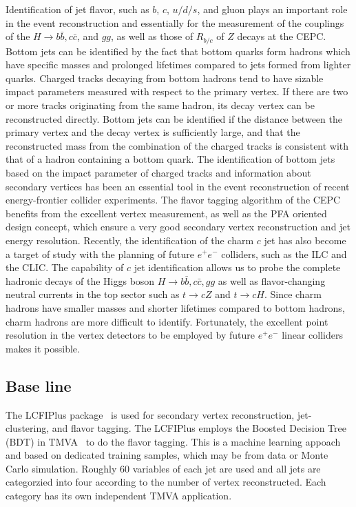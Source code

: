 Identification of jet flavor, such as $b$, $c$, $u/d/s$, and gluon plays an important role in the event reconstruction
and essentially for the measurement of the couplings of the $H \to b\bar{b}, c\bar{c}$, and $gg$,
as well as those of $R_{b/c}$ of $Z$ decays at the CEPC.
Bottom jets can be identified by the fact that bottom quarks form hadrons which have specific masses
and prolonged lifetimes compared to jets formed from lighter quarks.
Charged tracks decaying from bottom hadrons tend to have sizable impact parameters measured with respect to the primary vertex.
If there are two or more tracks originating from the same hadron, its decay vertex can be reconstructed directly.
Bottom jets can be identified if the distance between the primary vertex and the decay vertex is sufficiently large,
and that the reconstructed mass from the combination of the charged tracks is consistent with that of a hadron containing a bottom quark.
The identification of bottom jets based on the impact parameter of charged tracks and information
about secondary vertices has been an essential tool in the event reconstruction of recent energy-frontier collider experiments.
The flavor tagging algorithm of the CEPC benefits from the excellent vertex measurement, 
as well as the PFA oriented design concept, which ensure a very good secondary vertex reconstruction and jet energy resolution.    
Recently, the identification of the charm $c$ jet has also become a target of study with the planning of future $e^+e^-$ colliders,
such as the ILC and the CLIC.
The capability of $c$ jet identification allows us to probe the complete hadronic decays of the Higgs boson $H\to b\bar{b}, c\bar{c}, gg$
as well as flavor-changing neutral currents in the top sector such as $t \to cZ$ and $t \to cH$.
Since charm hadrons have smaller masses and shorter lifetimes compared to bottom hadrons, charm hadrons are more difficult to identify.
Fortunately, the excellent point resolution in the vertex detectors to be employed by future $e^+e^-$ linear colliders makes it possible.

\subsection{Base line}

The LCFIPlus package~\cite{Suehara:2015ura} is used for secondary vertex reconstruction, jet-clustering, and flavor tagging.
The LCFIPlus employs the Boosted Decision Tree (BDT) in TMVA~\cite{Therhaag:2010zz} to do the flavor tagging.
This is a machine learning appoach and based on dedicated training samples, which may be from data or Monte Carlo simulation.  
Roughly 60 variables of each jet are used and all  jets are categorzied into four according to the number of vertex reconstructed.
Each category has its own independent TMVA application.


